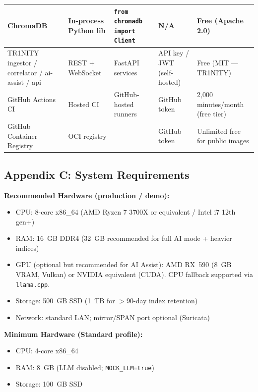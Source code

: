 \documentclass[11pt,a4paper]{article}
\begin{document}
\begin{longtable}{|>{}L{2.4cm}|L{2.0cm}|L{3.6cm}|L{2.6cm}|L{3.0cm}|}
\hline
ChromaDB & In-process Python lib & \texttt{from chromadb import Client} & N/A & Free (Apache 2.0) \\
\hline
TR1NITY ingestor / correlator / ai-assist / api & REST + WebSocket & FastAPI services & API key / JWT (self-hosted) & Free (MIT — TR1NITY) \\
\hline
GitHub Actions CI & Hosted CI & GitHub-hosted runners & GitHub token & 2{,}000 minutes/month (free tier) \\
\hline
GitHub Container Registry & OCI registry &  & GitHub token & Unlimited free for public images \\
\hline
\end{longtable}

\subsection{Appendix C: System Requirements}

\noindent\textbf{Recommended Hardware (production / demo):}
\begin{itemize}[leftmargin=*, itemsep=2pt]
  \item CPU: 8-core x86\_64 (AMD Ryzen 7 3700X or equivalent / Intel i7 12th gen+)
  \item RAM: 16~GB DDR4 (32~GB recommended for full AI mode + heavier indices)
  \item GPU (optional but recommended for AI Assist): AMD RX~590 (8~GB VRAM, Vulkan) or NVIDIA equivalent (CUDA). CPU fallback supported via \texttt{llama.cpp}.
  \item Storage: 500~GB SSD (1~TB for $>$90-day index retention)
  \item Network: standard LAN; mirror/SPAN port optional (Suricata)
\end{itemize}

\noindent\textbf{Minimum Hardware (Standard profile):}
\begin{itemize}[leftmargin=*, itemsep=2pt]
  \item CPU: 4-core x86\_64
  \item RAM: 8~GB (LLM disabled; \texttt{MOCK\_LLM=true})
  \item Storage: 100~GB SSD
\end{itemize}
\end{document}
